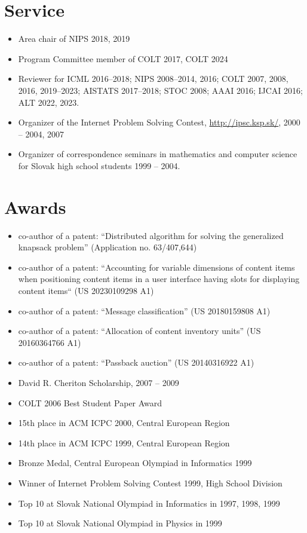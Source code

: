 \documentclass[9pt]{article}
\begin{document}
\section*{Service}

\begin{itemize}
\item Area chair of NIPS 2018, 2019
\item Program Committee member of COLT 2017, COLT 2024
\item Reviewer for ICML 2016--2018; NIPS 2008--2014, 2016; COLT 2007, 2008, 2016, 2019--2023; AISTATS 2017--2018; STOC 2008; AAAI 2016; IJCAI 2016; ALT 2022, 2023.
\item Organizer of the Internet Problem Solving Contest, \url{http://ipsc.ksp.sk/}, 2000 -- 2004, 2007
\item Organizer of correspondence seminars in mathematics and computer science for Slovak high school students 1999 -- 2004.
\end{itemize}

\section*{Awards}

\begin{itemize}
\item co-author of a patent: ``Distributed algorithm for solving the generalized knapsack problem'' (Application no. 63/407,644)
\item co-author of a patent: ``Accounting for variable dimensions of content items when positioning content items in a user interface having slots for displaying content items`` (US 20230109298 A1)
\item co-author of a patent: ``Message classification'' (US 20180159808 A1)
\item co-author of a patent: ``Allocation of content inventory units'' (US 20160364766 A1)
\item co-author of a patent: ``Passback auction'' (US 20140316922 A1)
\item David R. Cheriton Scholarship, 2007 -- 2009
\item COLT 2006 Best Student Paper Award
\item 15th place in ACM ICPC 2000, Central European Region
\item 14th place in ACM ICPC 1999, Central European Region
\item Bronze Medal, Central European Olympiad in Informatics 1999
\item Winner of Internet Problem Solving Contest 1999, High School Division
\item Top 10 at Slovak National Olympiad in Informatics in 1997, 1998, 1999
\item Top 10 at Slovak National Olympiad in Physics in 1999
\end{itemize}
\end{document}
